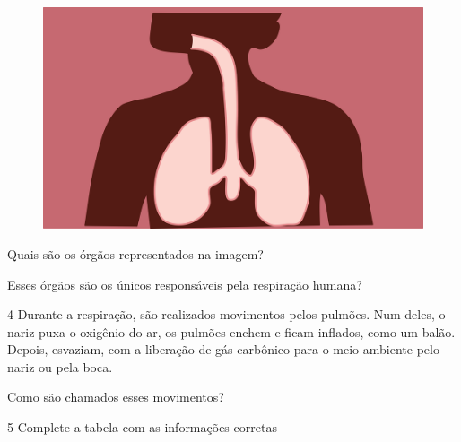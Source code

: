 \begin{figure}[htpb!]
\includegraphics[width=\textwidth]{./imgs/img1.png}
\end{figure}

\begin{escolha}
\item Quais são os órgãos representados na imagem?



\item Esses órgãos são os únicos responsáveis pela respiração humana?


\end{escolha}

\num{4} Durante a respiração, são realizados movimentos pelos
pulmões. Num deles, o nariz puxa o oxigênio do ar, os pulmões enchem e
ficam inflados, como um balão. Depois, esvaziam, com a liberação de gás
carbônico para o meio ambiente pelo nariz ou pela boca.

Como são chamados esses movimentos?


\num{5} Complete a tabela com as informações corretas

